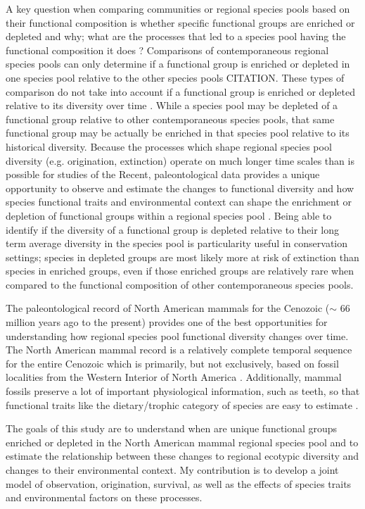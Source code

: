 \documentclass[12pt,letterpaper]{article}
\begin{document}
A key question when comparing communities or regional species pools based on their functional composition is whether specific functional groups are enriched or depleted and why; what are the processes that led to a species pool having the functional composition it does \citep{Mcgill2006,Weber2017,Brown1989,Smith2008b,Blois2009}? Comparisons of contemporaneous regional species pools can only determine if a functional group is enriched or depleted in one species pool relative to the other species pools CITATION. These types of comparison do not take into account if a functional group is enriched or depleted relative to its diversity over time \citep{Blois2009}. While a species pool may be depleted of a functional group relative to other contemporaneous species pools, that same functional group may be actually be enriched in that species pool relative to its historical diversity. Because the processes which shape regional species pool diversity (e.g. origination, extinction) operate on much longer time scales than is possible for studies of the Recent, paleontological data provides a unique opportunity to observe and estimate the changes to functional diversity and how species functional traits and environmental context can shape the enrichment or depletion of functional groups within a regional species pool \citep{Blois2009,Smith2008b}. Being able to identify if the diversity of a functional group is depleted relative to their long term average diversity in the species pool is particularity useful in conservation settings; species in depleted groups are most likely more at risk of extinction than species in enriched groups, even if those enriched groups are relatively rare when compared to the functional composition of other contemporaneous species pools.

The paleontological record of North American mammals for the Cenozoic (\(\sim\) 66 million years ago to the present) provides one of the best opportunities for understanding how regional species pool functional diversity changes over time. The North American mammal record is a relatively complete temporal sequence for the entire Cenozoic which is primarily, but not exclusively, based on fossil localities from the Western Interior of North America \citep{Alroy1996a,Alroy2000g,Alroy2009}. Additionally, mammal fossils preserve a lot of important physiological information, such as teeth, so that functional traits like the dietary/trophic category of species are easy to estimate \citep{Polly2015a,Polly2011b,Eronen2010a}.

The goals of this study are to understand when are unique functional groups enriched or depleted in the North American mammal regional species pool and to estimate the relationship between these changes to regional ecotypic diversity and changes to their environmental context. My contribution is to develop a joint model of observation, origination, survival, as well as the effects of species traits and environmental factors on these processes.
\end{document}
